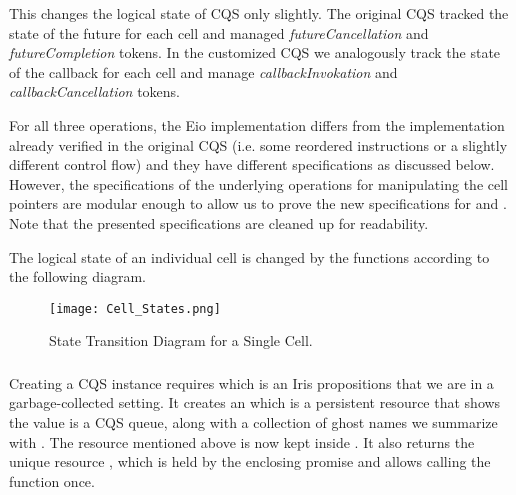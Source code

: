 This changes the logical state of CQS only slightly.
The original CQS tracked the state of the future for each cell and managed \textit{futureCancellation} and \textit{futureCompletion} tokens.
In the customized CQS we analogously track the state of the callback for each cell and manage \textit{callbackInvokation} and \textit{callbackCancellation} tokens.

For all three operations, the Eio implementation differs from the implementation already verified in the original CQS (i.e. some reordered instructions or a slightly different control flow) and they have different specifications as discussed below.
However, the specifications of the underlying operations for manipulating the cell pointers are modular enough to allow us to prove the new specifications for  and .
Note that the presented specifications are cleaned up for readability.


The logical state of an individual cell is changed by the functions according to the following diagram.

\begin{figure}[ht]
  \texttt{[image: Cell\_States.png]}
  \caption{State Transition Diagram for a Single Cell.}
  \label{fig:cqs-cell-states}
\end{figure}

\subsubsection{}
\label{sec:cqs-spec-create}

Creating a CQS instance requires  which is an Iris propositions that we are in a garbage-collected setting.
It creates an  which is a persistent resource that shows the value  is a CQS queue, along with a collection of ghost names we summarize with .
The resource  mentioned above is now kept inside .
It also returns the unique resource \gssignal{}, which is held by the enclosing promise and allows calling the  function once.

